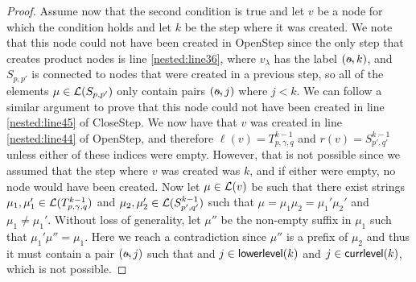 \begin{proof}
	Assume now that the second condition is true and let $v$ be a node for which the condition holds and let $k$ be the step where it was created. We note that this node could not have been created in {\sc OpenStep} since the only step that creates product nodes is line \ref{nested:line36}, where $v_{\lambda}$ has the label $(\oout,k)$, and $S_{p,p'}$ is connected to nodes that were created in a previous step, so all of the elements $\mu\in\mathcal{L}(S_{p,p'})$ only contain pairs $(\oout,j)$ where $j < k$. We can follow a similar argument to prove that this node could not have been created in line \ref{nested:line45} of {\sc CloseStep}. We now have that $v$ was created in line \ref{nested:line44} of {\sc OpenStep}, and therefore $\ell(v) = T^{k-1}_{p,\gamma,q}$ and $r(v) = S^{k-1}_{p',q'}$ unless either of these indices were empty. However, that is not possible since we assumed that the step where $v$ was created was $k$, and if either were empty, no node would have been created. Now let $\mu\in\mathcal{L}(v)$ be such that there exist strings $\mu_1,\mu_1'\in\mathcal{L}(T^{k-1}_{p,\gamma,q})$ and $\mu_2,\mu_2'\in\mathcal{L}(S^{k-1}_{p',q'})$ such that $\mu = \mu_1\mu_2 = \mu_1'\mu_2'$ and $\mu_1 \neq \mu_1'$. Without loss of generality, let $\mu''$ be the non-empty suffix in $\mu_1$ such that $\mu_1'\mu'' = \mu_1$. Here we reach a contradiction since $\mu''$ is a prefix of $\mu_2$ and thus it must contain a pair $(\oout,j)$ such that and $j \in{\sf lowerlevel}(k)$ and $j\in{\sf currlevel}(k)$, which is not possible.
\end{proof}
